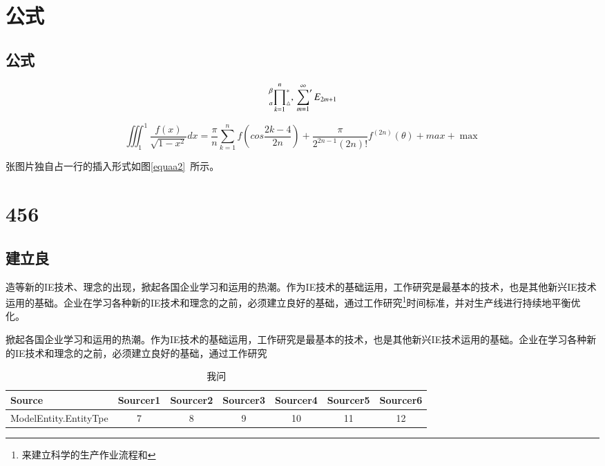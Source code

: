 \chapter{公式}
\section{公式}
\[\sideset{^\beta_a}{^\ast_\triangle}
\prod^{n}_{k=1},
\sideset{}{'}\sum_{m=1}^\infty E_{2m+1}\]

\begin{equation}
\label{equaa2}
\iiint_1^1\frac{f(x)}{\sqrt{1-x^2}}dx = \frac{\pi}{n}\sum_{k=1}^nf(cos\frac{2k-4}{2n})+\frac{\pi}{2^{2n-1}(2n)!}f^{(2n)}(\theta)+max+\max
\end{equation}



张图片独自占一行的插入形式如图\eqref{equaa2}~所示。
\chapter{456}
\section[see]{建立良}
造等新的IE技术、理念的出现，掀起各国企业学习和运用的热潮。作为IE技术的基础运用，工作研究是最基本的技术，也是其他新兴IE技术运用的基础。企业在学习各种新的IE技术和理念的之前，必须建立良好的基础，通过工作研究\footnote{来建立科学的生产作业流程和}时间标准，并对生产线进行持续地平衡优化。


掀起各国企业学习和运用的热潮。作为IE技术的基础运用，工作研究是最基本的技术，也是其他新兴IE技术运用的基础。企业在学习各种新的IE技术和\cite{2007}理念的之前，必须建立良好的基础，通过工作研究

\begin{table}[h]
  \centering
  \vspace{\baselineskip}
\caption{我问}
    \begin{tabular}{lcccccc}
    \toprule
    Source & Sourcer1 & Sourcer2 & Sourcer3 & Sourcer4 & Sourcer5 & Sourcer6 \\
    \midrule
    ModelEntity.EntityTpe & 7     & 8     & 9     & 10    & 11    & 12 \\
    \bottomrule
    \end{tabular}%
\end{table}%

